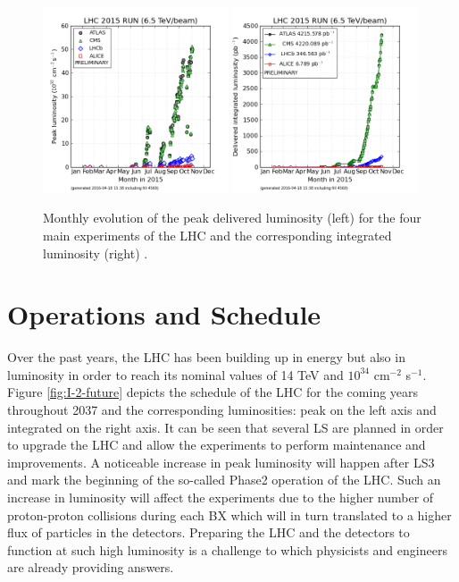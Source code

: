 		\begin{figure}[h!]
			\centering
			\includegraphics[width=0.49\textwidth]{img/I-2-LHC/luminosity-peak.png}
			\includegraphics[width=0.49\textwidth]{img/I-2-LHC/luminosity-integrated.png}
			\caption{Monthly evolution of the peak delivered luminosity (left) for the four main experiments of the LHC and the corresponding integrated luminosity (right) \cite{LUMI-PP-LPC}.}
			\label{fig:I-2-luminosity}
		\end{figure}

	\section{Operations and Schedule}

    Over the past years, the LHC has been building up in energy but also in luminosity in order to reach its nominal values of 14 TeV and $ 10^{34} $ cm$^{-2}$ s$^{-1}$. Figure \ref{fig:I-2-future} depicts the schedule of the LHC for the coming years throughout 2037 and the corresponding luminosities: peak on the left axis and integrated on the right axis. It can be seen that several LS are planned in order to upgrade the LHC and allow the experiments to perform maintenance and improvements. A noticeable increase in peak luminosity will happen after LS3 and mark the beginning of the so-called Phase2 operation of the LHC. Such an increase in luminosity will affect the experiments due to the higher number of proton-proton collisions during each BX which will in turn translated to a higher flux of particles in the detectors. Preparing the LHC and the detectors to function at such high luminosity is a challenge to which physicists and engineers are already providing answers.

